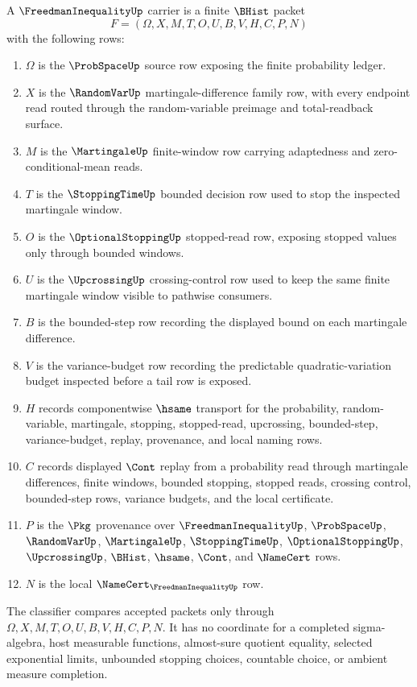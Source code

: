 \begin{definition}
\label{def:freedman-inequality-carrier}
A $\FreedmanInequalityUp$ carrier is a finite $\BHist$ packet
$$
F=(\Omega,X,M,T,O,U,B,V,H,C,P,N)
$$
with the following rows:
\begin{enumerate}
\item $\Omega$ is the $\ProbSpaceUp$ source row exposing the finite probability ledger.
\item $X$ is the $\RandomVarUp$ martingale-difference family row, with every endpoint read routed through the random-variable preimage and total-readback surface.
\item $M$ is the $\MartingaleUp$ finite-window row carrying adaptedness and zero-conditional-mean reads.
\item $T$ is the $\StoppingTimeUp$ bounded decision row used to stop the inspected martingale window.
\item $O$ is the $\OptionalStoppingUp$ stopped-read row, exposing stopped values only through bounded windows.
\item $U$ is the $\UpcrossingUp$ crossing-control row used to keep the same finite martingale window visible to pathwise consumers.
\item $B$ is the bounded-step row recording the displayed bound on each martingale difference.
\item $V$ is the variance-budget row recording the predictable quadratic-variation budget inspected before a tail row is exposed.
\item $H$ records componentwise $\hsame$ transport for the probability, random-variable, martingale, stopping, stopped-read, upcrossing, bounded-step, variance-budget, replay, provenance, and local naming rows.
\item $C$ records displayed $\Cont$ replay from a probability read through martingale differences, finite windows, bounded stopping, stopped reads, crossing control, bounded-step rows, variance budgets, and the local certificate.
\item $P$ is the $\Pkg$ provenance over $\FreedmanInequalityUp$, $\ProbSpaceUp$, $\RandomVarUp$, $\MartingaleUp$, $\StoppingTimeUp$, $\OptionalStoppingUp$, $\UpcrossingUp$, $\BHist$, $\hsame$, $\Cont$, and $\NameCert$ rows.
\item $N$ is the local $\NameCert_{\FreedmanInequalityUp}$ row.
\end{enumerate}
The classifier compares accepted packets only through $\Omega,X,M,T,O,U,B,V,H,C,P,N$. It has no coordinate for a completed sigma-algebra, host measurable functions, almost-sure quotient equality, selected exponential limits, unbounded stopping choices, countable choice, or ambient measure completion.
\end{definition}

